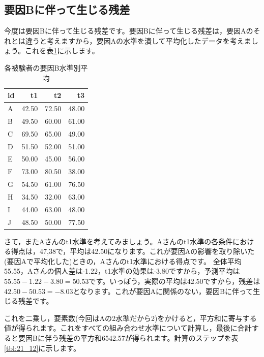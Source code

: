 \documentclass{ltjbook}
\begin{document}
\subsection{要因Bに伴って生じる残差}
今度は要因Bに伴って生じる残差です。要因Bに伴って生じる残差は，要因Aのそれとは違うと考えますから，要因Aの水準を潰して平均化したデータを考えましょう。これを表\ref{tbl:21_11}に示します。
\begin{table}[ht]
\centering
	\caption{各被験者の要因B水準別平均}
	\label{tbl:21_11}
\begin{tabular}{lrrr}
  \hline
id & t1 & t2 & t3 \\
  \hline
A & 42.50 & 72.50 & 48.00 \\
  B & 49.50 & 60.00 & 61.00 \\
  C & 69.50 & 65.00 & 49.00 \\
  D & 51.50 & 52.00 & 51.00 \\
  E & 50.00 & 45.00 & 56.00 \\
  F & 73.00 & 80.50 & 38.00 \\
  G & 54.50 & 61.00 & 76.50 \\
  H & 34.50 & 32.00 & 63.00 \\
  I & 44.00 & 63.00 & 48.00 \\
  J & 48.50 & 50.00 & 77.50 \\
   \hline
\end{tabular}
\end{table}

さて，またAさんのt1水準を考えてみましょう。Aさんのt1水準の各条件における得点は，47,38で，平均は42.50になります。これが要因Aの影響を取り除いた(要因Aで平均化した)ときの，Aさんのt1水準における得点です。
全体平均55.55，Aさんの個人差は-1.22，t1水準の効果は-3.80ですから，予測平均は$55.55-1.22-3.80=50.53$です。いっぽう，実際の平均は42.50ですから，残差は$42.50-50.53=-8.03$となります。これが要因Aに関係のない，要因Bに伴って生じる残差です。

これを二乗し，要素数(今回はAの2水準だから2)をかけると，平方和に寄与する値が得られます。これをすべての組み合わせ水準について計算し，最後に合計すると要因Bに伴う残差の平方和6542.57が得られます。計算のステップを表\ref{tbl:21_12}に示します。
\end{document}
